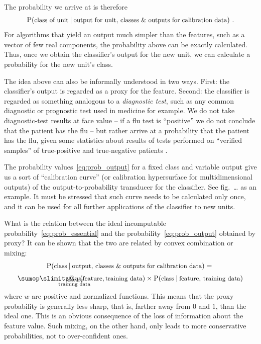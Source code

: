 \documentclass[\ifafour a4paper,12pt,\else a5paper,10pt,\fi%
onecolumn,oneside,article,%
british%
]{memoir}
\makeatletter
\theoremstyle{remark}
\theoremstyle{innote}
\def\sum{\DOTSI\sumop\slimits@}
\newcommand*{\amp}{\&}
\newcommand*{\pencil}{{\fontencoding{U}\fontfamily{fontawesometwo}\selectfont\symbol{210}}}
\newcommand{\mynotep}[1]{{\footnotesize\color{notecolour}\pencil\ #1}}
\renewcommand*{\P}{\mathrm{P}}%
\renewcommand*{\|}[1][]{\nonscript\:#1\vert\nonscript\:\mathopen{}}
\newcommand*{\chap}{ch.}%
\newcommand*{\fig}{fig.}%
\newcommand*{\texts}[1]{\text{\small #1}}
\makeatother
\begin{document}
The probability we arrive at is therefore
\begin{equation}
  \label{eq:prob_output}
  \P(\texts{class of unit} \| \texts{output for unit},\,
  \texts{classes \amp\ outputs for calibration data}) \ .
\end{equation}
For algorithms that yield an output much simpler than the features, such as a vector of few real components, the probability above can be exactly calculated. Thus, once we obtain the classifier's output for the new unit, we can calculate a probability for the new unit's class.

\medskip

The idea above can also be informally understood in two ways. First: the classifier's output is regarded as a proxy for the feature. Second: the classifier is regarded as something analogous to a \emph{diagnostic test}, such as any common diagnostic or prognostic test used in medicine for example. We do not take diagnostic-test results at face value -- if a flu test is \enquote{positive} we do not conclude that the patient has the flu -- but rather arrive at a probability that the patient has the flu, given some statistics about results of tests performed on \enquote{verified samples} of true-positive and true-negative patients \autocites[\chap~5]{soxetal1988_r2013}[\chap~5]{huninketal2001_r2014}[see also][]{jennyetal2018}.

The probability values~\eqref{eq:prob_output} for a fixed class and variable output give us a sort of \enquote{calibration curve} (or calibration hypersurface for multidimensional outputs) of the output-to-probability transducer for the classifier. See \fig\mynotep{\ldots} as an example. It must be stressed that such curve needs to be calculated only once, and it can be used for all further applications of the classifier to new units.

\medskip

What is the relation between the ideal incomputable probability~\eqref{eq:prob_essential} and the probability~\eqref{eq:prob_output} obtained by proxy? It can be shown that the two are related by convex combination or mixing:
\begin{multline}
  \label{eq:relation_two_probs}
  \P(\texts{class} \| \texts{output},\,
  \texts{classes \amp\ outputs for calibration data}) ={}\\[\jot]
  \sum_{\mathclap{\substack{\text{feature}\\\text{training data}}}}
  w(\texts{feature}, \texts{training data})\times
  \P(\texts{class} \| \texts{feature},\, \texts{training data})
\end{multline}
where $w$ are positive and normalized functions. This means that the proxy probability is generally less sharp, that is, farther away from $0$ and $1$, than the ideal one. This is an obvious consequence of the loss of information about the feature value. Such mixing, on the other hand, only leads to more conservative probabilities, not to over-confident ones.
\end{document}
